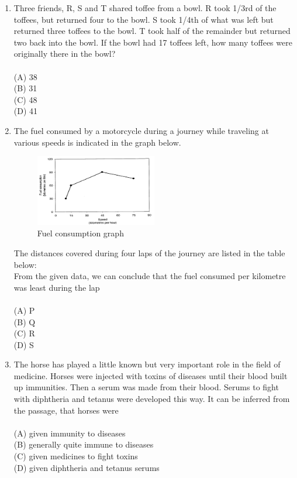 \documentclass[journal,12pt,onecolumn]{IEEEtran}
\begin{document}
\begin{enumerate}[label=\textbf{Q\arabic*.},itemsep=2em]
\item Three friends, R, S and T shared toffee from a bowl. R took 1/3rd of the toffees, but returned four to the bowl. S took 1/4th of what was left but returned three toffees to the bowl. T took half of the remainder but returned two back into the bowl. If the bowl had 17 toffees left, how many toffees were originally there in the bowl? \\
\vspace{0.2cm}
\hfill{} \\
(A) 38 \\
(B) 31 \\
(C) 48 \\
(D) 41

\newpage
\item The fuel consumed by a motorcycle during a journey while traveling at various speeds is indicated in the graph below.

\begin{figure}[h]
\centering
\includegraphics[width=0.5\textwidth]{figs/GA/fig1.png}
\caption{Fuel consumption graph}
\label{GA/fig1.png}
\end{figure}

The distances covered during four laps of the journey are listed in the table below:\\



From the given data, we can conclude that the fuel consumed per kilometre was least during the lap \\
\vspace{0.2cm}
\hfill{} \\
(A) P \\
(B) Q \\
(C) R \\
(D) S

\item The horse has played a little known but very important role in the field of medicine. Horses were injected with toxins of diseases until their blood built up immunities. Then a serum was made from their blood. Serums to fight with diphtheria and tetanus were developed this way. It can be inferred from the passage, that horses were \\
\vspace{0.2cm}
\hfill{} \\
(A) given immunity to diseases \\
(B) generally quite immune to diseases \\
(C) given medicines to fight toxins \\
(D) given diphtheria and tetanus serums


\end{enumerate}
\end{document}
